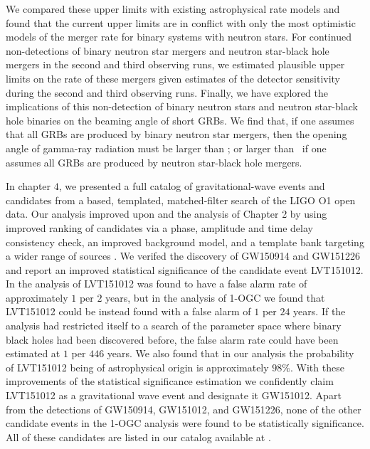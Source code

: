 We compared these upper limits with existing astrophysical rate models and found that the
current upper limits are in conflict with only the most optimistic models of the merger
rate for binary systems with neutron stars. For continued non-detections of
binary neutron star mergers and neutron star-black hole mergers in the second and
third observing runs,
we estimated plausible upper limits on the rate of these mergers given estimates of the detector
sensitivity during the second and third observing runs.
Finally, we have explored the implications of this non-detection of binary neutron stars and
neutron star-black hole binaries on
the beaming angle of short \acp{GRB}. We find that, if one assumes that all \acp{GRB}
are produced by binary neutron star mergers, then the opening angle of gamma-ray radiation must be larger
than \GRBBNSBeamingAngleConstraint; or larger than \GRBNSBHFiveBeamingAngleConstraint\ if
one assumes all \acp{GRB} are produced by neutron star-black hole mergers.


In chapter $4$, we presented a full catalog of gravitational-wave events and candidates from a \pycbc{}\-based, templated, matched-filter search of the LIGO O1 open data. Our analysis improved upon \cite{TheLIGOScientific:2016pea,Abbott:2016ymx} and the analysis of Chapter 2 by using improved ranking of candidates via a phase, amplitude and time delay consistency check, an improved background model, and a template bank targeting a wider range of sources \citep{Nitz:2017svb, Nitz:2017lco,DalCanton:2017ala}. We verifed the discovery of GW150914 and GW151226 and report an improved statistical significance of the candidate event LVT151012. In the analysis of \cite{TheLIGOScientific:2016pea,Abbott:2016ymx} LVT151012 was found to have a false alarm rate of approximately $1$ per $2$ years, but in the analysis of 1-OGC we found that LVT151012 could be instead found with a false alarm of $1$ per $24$ years. If the analysis had restricted itself to a search of the parameter space where binary black holes had been discovered before, the false alarm rate could have been estimated at $1$ per $446$ years. We also found that in our analysis the probability of LVT151012 being of astrophysical origin is approximately $98 \%$. With these improvements of the statistical significance estimation we confidently claim LVT151012 as a gravitational wave event and designate it GW151012. Apart from the detections of GW150914, GW151012, and GW151226, none of the other candidate events in the 1-OGC analysis were found to be statistically significance. All of these candidates are listed in our catalog available at \release{}.

